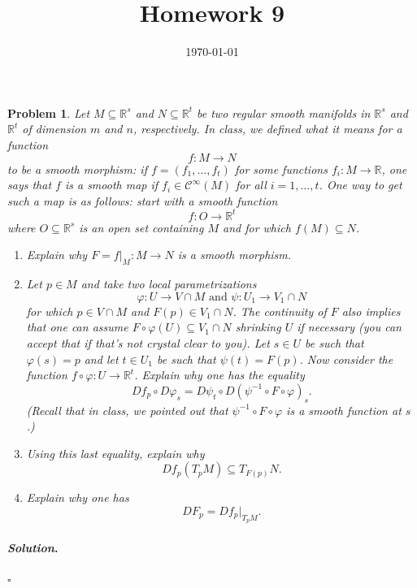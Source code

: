\documentclass[reqno]{amsart}
\theoremstyle{plain}
\newtheorem{problem}{Problem}
\theoremstyle{definition}
\newenvironment{solution}{\paragraph{\emph{Solution}.}}{\hfill$\square$}
\begin{document}
 

\title[Homework 9]{Homework 9}

\date{\today} 
\maketitle 

\begin{problem}
Let $M \subseteq \mathbb{R}^{s}$ and $N \subseteq \mathbb{R}^{t}$ be two regular smooth manifolds in $\mathbb{R}^{s}$ and $\mathbb{R}^{t}$ of dimension $m$ and $n$, respectively.  In class, we defined what it means for a function
$$f: M \rightarrow N $$ 
to be a smooth morphism: if $f = (f_{1},\ldots, f_{t})$ for some functions $f_{i}: M \rightarrow \mathbb{R}$, one says that $f$ is a smooth map if $f_{i} \in \mathcal{C}^{\infty}(M)$ for all $i=1,\ldots,t$.  One way to get such a map is as follows:  start with a smooth function
$$f: O \rightarrow \mathbb{R}^{t}$$
where $O \subseteq \mathbb{R}^{s}$ is an open set containing $M$ and for which $f(M) \subseteq N$.
\begin{enumerate}
\item Explain why $F = f|_{M}: M \rightarrow N$ is a smooth morphism.
\item Let $p \in M$ and take two local parametrizations
$$\varphi: U \rightarrow V \cap M \text{ and } \psi: U_{1} \rightarrow V_{1} \cap N $$
for which $p \in V \cap M$ and $F(p) \in V_{1} \cap N$.  The continuity of $F$ also implies that one can assume $F\circ \varphi(U) \subseteq V_{1} \cap N$ shrinking $U$ if necessary (you can accept that if that's not crystal clear to you).  Let $s \in U$ be such that $\varphi(s) = p$ and let $t \in U_{1}$ be such that $\psi(t) = F(p)$.  Now consider the function $f \circ \varphi: U \rightarrow \mathbb{R}^{t}$.  Explain why one has the equality
$$Df_{p} \circ D\varphi_{s} = D\psi_{t} \circ D(\psi^{-1} \circ F \circ \varphi)_{s}. $$
(Recall that in class, we pointed out that $\psi^{-1} \circ F \circ \varphi$ is a smooth function at $s$.)
\item Using this last equality, explain why 
$$Df_{p}(T_{p}M) \subseteq T_{F(p)}N. $$
\item Explain why one has
$$DF_{p} = Df_{p}|_{T_{p}M}. $$
\end{enumerate}
\end{problem}
\begin{solution}

\end{solution}
\end{document}
